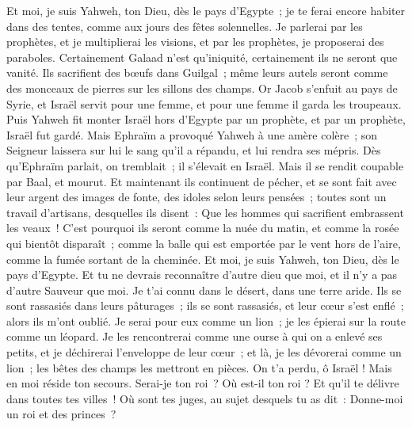 \begin{multicols}{2}
Et moi, je suis Yahweh, ton Dieu, dès le pays d'Egypte~; je te ferai encore habiter dans des tentes, comme aux jours des fêtes solennelles.
Je parlerai par les prophètes, et je multiplierai les visions, et par les prophètes, je proposerai des paraboles.
Certainement Galaad n'est qu'iniquité, certainement ils ne seront que vanité. Ils sacrifient des bœufs dans Guilgal~; même leurs autels seront comme des monceaux de pierres sur les sillons des champs.
Or Jacob s'enfuit au pays de Syrie, et Israël servit pour une femme, et pour une femme il garda les troupeaux.
Puis Yahweh fit monter Israël hors d'Egypte par un prophète, et par un prophète, Israël fut gardé.
Mais Ephraïm a provoqué Yahweh à une amère colère~; son Seigneur laissera sur lui le sang qu'il a répandu, et lui rendra ses mépris.
\VerseOne{}Dès qu'Ephraïm parlait, on tremblait~; il s'élevait en Israël. Mais il se rendit coupable par Baal, et mourut.
Et maintenant ils continuent de pécher, et se sont fait avec leur argent des images de fonte, des idoles selon leurs pensées~; toutes sont un travail d'artisans, desquelles ils disent~: Que les hommes qui sacrifient embrassent les veaux~!
C'est pourquoi ils seront comme la nuée du matin, et comme la rosée qui bientôt disparaît~; comme la balle qui est emportée par le vent hors de l'aire, comme la fumée sortant de la cheminée.
Et moi, je suis Yahweh, ton Dieu, dès le pays d'Egypte. Et tu ne devrais reconnaître d'autre dieu que moi, et il n'y a pas d'autre Sauveur que moi.
Je t'ai connu dans le désert, dans une terre aride.
Ils se sont rassasiés dans leurs pâturages~; ils se sont rassasiés, et leur cœur s'est enflé~; alors ils m'ont oublié.
Je serai pour eux comme un lion~; je les épierai sur la route comme un léopard.
Je les rencontrerai comme une ourse à qui on a enlevé ses petits, et je déchirerai l'enveloppe de leur cœur~; et là, je les dévorerai comme un lion~; les bêtes des champs les mettront en pièces.
On t'a perdu, ô Israël ! Mais en moi réside ton secours. 
Serai-je ton roi~? Où est-il ton roi ? Et qu'il te délivre dans toutes tes villes~! Où sont tes juges, au sujet desquels tu as dit~: Donne-moi un roi et des princes~?

\end{multicols}
